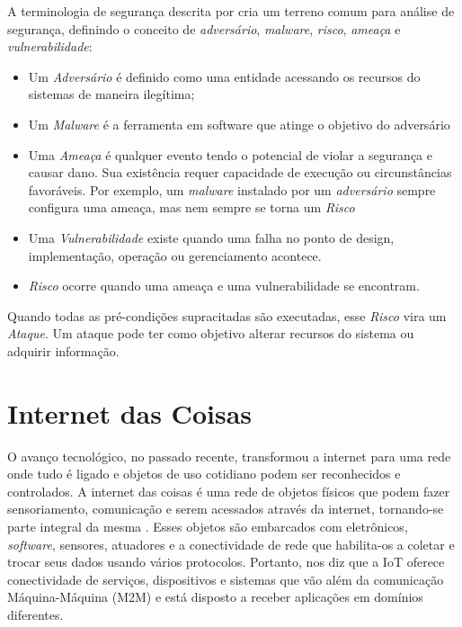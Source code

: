 \documentclass[tcc,capa]{texufpel}
\begin{document}
A terminologia de segurança descrita por \citet{schiller} cria um terreno comum para análise de segurança, definindo o conceito de \textit{adversário}, \textit{malware}, \textit{risco}, \textit{ameaça} e \textit{vulnerabilidade}:

\begin{itemize}
    \item Um \textit{Adversário} é definido como uma entidade acessando os recursos do sistemas de maneira ilegítima;
    \item Um \textit{Malware} é a ferramenta em software que atinge o objetivo do adversário
    \item Uma \textit{Ameaça} é qualquer evento tendo o potencial de violar a segurança e causar dano. Sua existência requer capacidade de execução ou circunstâncias favoráveis. Por exemplo, um \textit{malware} instalado por um \textit{adversário} sempre configura uma ameaça, mas nem sempre se torna um \textit{Risco}
    \item Uma \textit{Vulnerabilidade} existe quando uma falha no ponto de design, implementação, operação ou gerenciamento acontece.
    \item \textit{Risco} ocorre quando uma ameaça e uma vulnerabilidade se encontram.
\end{itemize}

Quando todas as pré-condições supracitadas são executadas, esse \textit{Risco} vira um \textit{Ataque}. Um ataque pode ter como objetivo alterar recursos do sistema ou adquirir informação.

\section{Internet das Coisas}

O avanço tecnológico, no passado recente, transformou a internet para uma rede onde tudo é ligado e objetos de uso cotidiano podem ser reconhecidos e controlados. A internet das coisas é uma rede de objetos físicos que podem fazer sensoriamento, comunicação e serem acessados através da internet, tornando-se parte integral da mesma \cite{Sharma2019}. Esses objetos são embarcados com eletrônicos, \textit{software}, sensores, atuadores e a conectividade de rede que habilita-os a coletar e trocar seus dados usando vários protocolos. Portanto, \cite{Sharma2019} nos diz que a IoT oferece conectividade de serviços, dispositivos e sistemas que vão além da comunicação Máquina-Máquina (M2M) e está disposto a receber aplicações em domínios diferentes.
\end{document}
